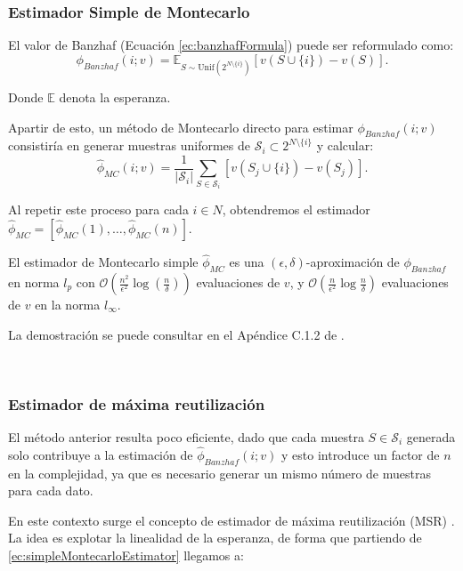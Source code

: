 \subsubsection*{Estimador Simple de Montecarlo}
El valor de Banzhaf (Ecuación \ref{ec:banzhafFormula})
puede ser reformulado como:
\begin{equation*}
  \label{simpleMontecarlo}
  \phi_{Banzhaf}(i;v) = \mathbb{E}_{S \sim \text{Unif}
  (2^{N\setminus \{i\}})} [v(S \cup \{i\})-v(S)].
\end{equation*}

Donde $\mathbb{E}$  denota la esperanza.

Apartir de esto, un método de Montecarlo directo para estimar
$\phi_{Banzhaf}(i;v)$ consistiría
en generar muestras uniformes de $\mathcal{S}_i
\subset 2^{N \setminus \{i\}}$ y calcular:
\begin{equation}
  \label{ec:simpleMontecarloEstimator}
  \hat{\phi}_{MC}(i;v) = \frac{1}{|\mathcal{S}_i|}\sum_{S \in
  \mathcal{S}_i} [v(S_j \cup \{i\})-v(S_j)].
\end{equation}

Al repetir este proceso para cada $i \in N$, obtendremos
el estimador $\hat{\phi}_{MC} = [\hat{\phi}_{MC}(1),\dots,
\hat{\phi}_{MC}(n)]$. 


\begin{theorem}
  El estimador de Montecarlo simple $\hat{\phi}_{MC}$
  es una $(\epsilon,\delta)$-aproximación de $\phi_{Banzhaf}$
  en norma $l_p$ con $\mathcal{O}(\frac{n^2}{\epsilon^2}
  \log(\frac{n}{\delta}))$ evaluaciones de $v$, y
  $\mathcal{O}(\frac{n}{\epsilon^2}
  \log{\frac{n}{\delta}})$ evaluaciones de $v$ en la norma
  $l_{\infty}$.
\end{theorem}

La demostración se puede consultar en el Apéndice
C.1.2 de \cite{dataBanzhaf}.

\

\subsubsection*{Estimador de máxima reutilización}

El método anterior resulta poco eficiente,
dado que cada muestra $S \in \mathcal{S}_i$ generada
solo contribuye a la estimación de
$\hat{\phi}_{Banzhaf}(i;v)$ y esto introduce un
factor de $n$ en la complejidad, ya que es necesario
generar un mismo número de muestras para cada dato.

En este contexto surge el concepto de estimador de máxima
reutilización (MSR)  \cite{dataBanzhaf}.
La idea es explotar la linealidad de la esperanza, de forma que
partiendo de \ref{ec:simpleMontecarloEstimator} llegamos a:

